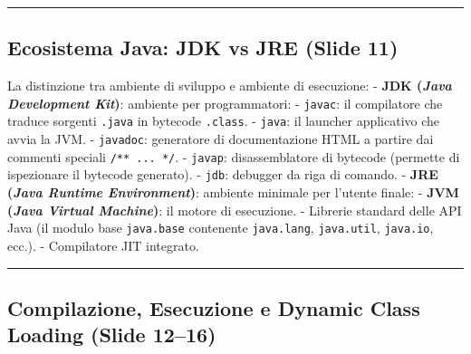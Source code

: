 \documentclass[11pt,a4paper,oneside]{report}
\newcommand{\passthrough}[1]{#1}
\begin{document}
\begin{center}\rule{0.5\linewidth}{0.5pt}\end{center}

\subsection{Ecosistema Java: JDK vs JRE (Slide
11)}\label{chap03_ecosistema-java-jdk-vs-jre-slide-11}

La distinzione tra ambiente di sviluppo e ambiente di esecuzione: -
\textbf{JDK (\emph{Java Development Kit})}: ambiente per programmatori:
- \passthrough{\lstinline!javac!}: il compilatore che traduce sorgenti
\passthrough{\lstinline!.java!} in bytecode
\passthrough{\lstinline!.class!}. - \passthrough{\lstinline!java!}: il
launcher applicativo che avvia la JVM. -
\passthrough{\lstinline!javadoc!}: generatore di documentazione HTML a
partire dai commenti speciali \passthrough{\lstinline!/** ... */!}. -
\passthrough{\lstinline!javap!}: disassemblatore di bytecode (permette
di ispezionare il bytecode generato). - \passthrough{\lstinline!jdb!}:
debugger da riga di comando. - \textbf{JRE (\emph{Java Runtime
Environment})}: ambiente minimale per l'utente finale: - \textbf{JVM
(\emph{Java Virtual Machine})}: il motore di esecuzione. - Librerie
standard delle API Java (il modulo base
\passthrough{\lstinline!java.base!} contenente
\passthrough{\lstinline!java.lang!},
\passthrough{\lstinline!java.util!}, \passthrough{\lstinline!java.io!},
ecc.). - Compilatore JIT integrato.

\begin{center}\rule{0.5\linewidth}{0.5pt}\end{center}

\subsection{Compilazione, Esecuzione e Dynamic Class Loading (Slide
12--16)}\label{chap03_compilazione-esecuzione-e-dynamic-class-loading-slide-1216}
\end{document}
